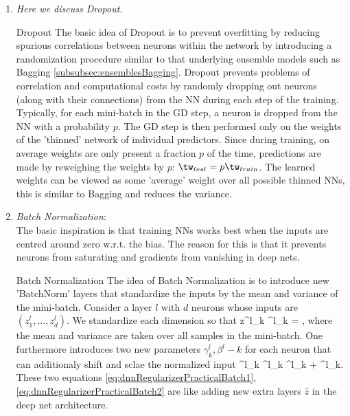 \begin{enumerate}
\begin{mybox}{Early Stopping}
\end{mybox}
\item \label{subsubsec:dnnRegularizerPracticalDropout} \emph{Here we discuss Dropout}.
\begin{mybox}{Dropout}
The basic idea of Dropout is to prevent overfitting by reducing spurious correlations between neurons within the network by introducing a randomization procedure similar to that underlying ensemble models such as Bagging \ref{subsubsec:ensemblesBagging}. Dropout prevents problems of correlation and computational costs by randomly dropping out neurons (along with their connections) from the NN during each step of the training. Typically, for each mini-batch in the GD step, a neuron is dropped from the NN with a probability $p$. The GD step is then performed only on the weights of the ’thinned’ network of individual predictors. Since during training, on average weights are only present a fraction $p$ of the time, predictions are made by reweighing the weights by $p$: $\tw_{test} = p\tw_{train}$. The learned weights can be viewed as some ’average’ weight over all possible thinned NNs, this is similar to Bagging and reduces the variance.
\end{mybox}
\item \label{subsubsec:dnnRegularizerPracticalBatchNorm}\emph{Batch Normalization}:\\
The basic inspiration is that training NNs works best when the inputs are centred around zero w.r.t. the bias. The reason for this is that it prevents neurons from saturating and gradients from vanishing in deep nets.
\begin{mybox}{Batch Normalization}
	The idea of Batch Normalization is to introduce new ’BatchNorm’ layers that standardize the inputs by the mean and variance of the mini-batch. Consider a layer $l$ with $d$ neurons whose inputs are $(z^l_1,\dots,z^l_d)$. We standardize each dimension so that
	\be 
	\label{eq:dnnRegularizerPracticalBatch1}
	z^l_k \rightarrow {}^l_k = ,
	\ee
	where the mean and variance are taken over all samples in the mini-batch. One furthermore introduces two new parameters $\gamma^l_k, \beta^l-k$ for each neuron that can additionaly shift and sclae the normalized input
	\be 
	\label{eq:dnnRegularizerPracticalBatch2}
	^l_k \rightarrow \gamma^l_k ^l_k + \beta^l_k.
	\ee 
	These two equations \ref{eq:dnnRegularizerPracticalBatch1},\ref{eq:dnnRegularizerPracticalBatch2} are like adding new extra layers $\hat{z}$ in the deep net architecture.

\end{mybox}
\end{enumerate}
